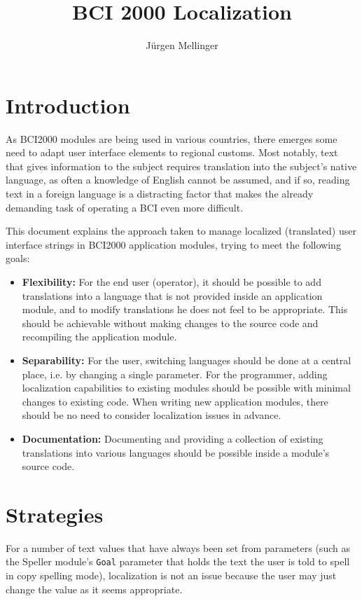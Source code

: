 \documentclass[12pt,a4paper]{article}
\title{BCI 2000 Localization}
\author{J\"{u}rgen Mellinger}
\begin{document}
\maketitle
\tableofcontents

\pagebreak
\section{Introduction}

As BCI2000 modules are being used in various countries, there emerges some need
to adapt user interface elements to regional customs. Most notably, text that
gives information to the subject requires translation into the subject's native
language, as often a knowledge of English cannot be assumed, and if so, reading
text in a foreign language is a distracting factor that makes the already demanding
task of operating a BCI even more difficult.

This document explains the approach taken to manage localized (translated) user interface
strings in BCI2000 application modules, trying to meet the following goals:

\begin{itemize}
\item\textbf{Flexibility:}
For the end user (operator), it should be possible to add translations into a language that is not provided inside an
application module, and to modify translations he does not feel to be appropriate.
This should be achievable without making changes to the source code and recompiling the application module.
\item\textbf{Separability:}
For the user, switching languages should be done at a central place, i.e. by changing a single parameter.
For the programmer,
adding localization capabilities to existing modules should
be possible with minimal changes to existing code.
When writing new application modules, there should be no need to consider localization issues in advance.
\item\textbf{Documentation:}
Documenting and providing a collection of existing translations into various languages should be possible inside a module's source code.
\end{itemize}


\section{Strategies}

For a number of text values that have always been set from parameters (such as the Speller module's \texttt{Goal} parameter that holds the text the user is told to spell in copy spelling mode), localization is not an issue because the user may just change the value as it seems appropriate.
\end{document}

